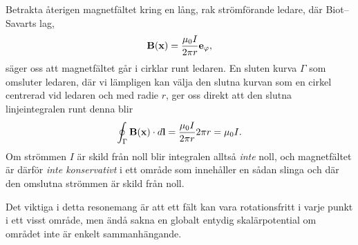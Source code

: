 Betrakta {\aa}terigen magnetf{\"a}ltet kring en l{\aa}ng, rak
str{\"o}mf{\"o}rande ledare, d{\"a}r Biot--Savarts lag,
$$
  {\bf B}({\bf x})={{\mu_0I}\over{2\pi r}}{\bf e}_{\varphi},
$$
s{\"a}ger oss att magnetf{\"a}ltet g{\aa}r i cirklar runt ledaren. En sluten
kurva $\Gamma$ som omsluter ledaren, d{\"a}r vi l{\"a}mpligen kan v{\"a}lja
den slutna kurvan som en cirkel centrerad vid ledaren och med radie $r$, ger
oss direkt att den slutna linjeintegralen runt denna blir
$$
  \oint_{\Gamma}{\bf B}({\bf x})\cdot d{\bf l}
    ={{\mu_0I}\over{2\pi r}}2\pi r
    =\mu_0 I.
$$
Om str{\"o}mmen $I$ {\"a}r skild fr{\aa}n noll blir integralen allts{\aa}
{\it inte} noll, och magnetf{\"a}ltet {\"a}r d{\"a}rf{\"o}r {\it inte
konservativt} i ett omr{\aa}de som inneh{\aa}ller en s{\aa}dan slinga och
d{\"a}r den omslutna str{\"o}mmen {\"a}r skild fr{\aa}n noll.

Det viktiga i detta resonemang {\"a}r att ett f{\"a}lt kan vara rotationsfritt
i varje punkt i ett visst omr{\aa}de, men {\"a}nd{\aa} sakna en globalt entydig
skal{\"a}rpotential om omr{\aa}det inte {\"a}r enkelt sammanh{\"a}ngande.

